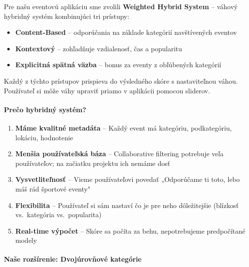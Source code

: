                                                                                                                                                                                                             
  Pre našu eventovú aplikáciu sme zvolili \textbf{Weighted Hybrid System} --
  váhový hybridný systém kombinujúci tri prístupy:

  \begin{itemize}
      \item \textbf{Content-Based} -- odporúčania na základe kategórií navštívených eventov
      \item \textbf{Kontextový} -- zohľadňuje vzdialenosť, čas a popularitu
      \item \textbf{Explicitná spätná väzba} -- bonus za eventy z obľúbených kategórií
  \end{itemize}

  Každý z týchto prístupov prispieva do výsledného skóre s nastaviteľnou váhou.
  Používateľ si môže váhy upraviť priamo v aplikácii pomocou sliderov.

  \paragraph{Prečo hybridný systém?}

  \begin{enumerate}
      \item \textbf{Máme kvalitné metadáta} -- Každý event má kategóriu, podkategóriu,
            lokáciu, hodnotenie

      \item \textbf{Menšia používateľská báza} -- Collaborative filtering potrebuje
            veľa používateľov; na začiatku projektu ich nemáme dosť

      \item \textbf{Vysvetliteľnosť} -- Vieme používateľovi povedať
            „Odporúčame ti toto, lebo máš rád športové eventy"

      \item \textbf{Flexibilita} -- Používateľ si sám nastaví čo je pre neho dôležitejšie
            (blízkosť vs.\ kategória vs.\ popularita)

      \item \textbf{Real-time výpočet} -- Skóre sa počíta za behu,
            nepotrebujeme predpočítané modely
  \end{enumerate}

  \paragraph{Naše rozšírenie: Dvojúrovňové kategórie}

